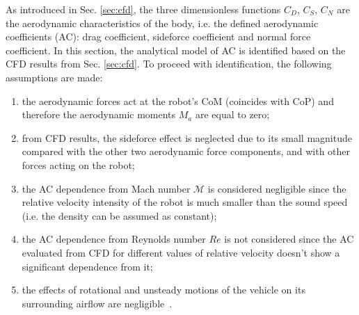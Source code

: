 


As introduced in Sec. \ref{sec:cfd}, the three dimensionless functions $C_D$, $C_S$, $C_N$ are the aerodynamic characteristics of the body, i.e. the defined aerodynamic coefficients (AC): drag coefficient, sideforce coefficient and normal force coefficient. In this section, the analytical model of AC is identified based on the CFD results from Sec. \ref{sec:cfd}. To proceed with identification, the following assumptions are made:

\begin{enumerate}
\item the aerodynamic forces act at the robot's CoM (coincides with CoP) and therefore the aerodynamic moments ${M}_a$ are equal to zero;
\item from CFD results, the sideforce effect is neglected due to its small magnitude compared with the other two aerodynamic force components, and with other forces acting on the robot;
\item the AC dependence from Mach number $\mathcal{M}$ is considered negligible since the relative velocity intensity of the robot is much smaller than the sound speed (i.e. the density can be assumed as constant);
\item the AC dependence from Reynolds number $Re$ is not considered since the AC evaluated from CFD for different values of relative velocity doesn't show a significant dependence from it;
\item the effects of rotational and unsteady motions of the vehicle on its surrounding airflow are negligible~\cite{c5}.
\end{enumerate}

